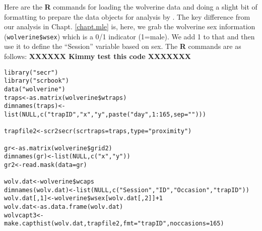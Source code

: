 Here are the {\bf R} commands for loading the wolverine data and doing
a slight bit of formatting to prepare the data objects for analysis by
\mbox{\secr}. The key difference from our analysis in
Chapt. \ref{chapt.mle} is, here, we grab the wolverine sex information
(\mbox{\tt wolverine\$wsex}) which is a 0/1 indicator (1=male). We add
1 to that and then use it to define the ``Session'' variable based on sex.
The {\bf R} commands are as follows:  {\bf XXXXXX Kimmy test this code XXXXXXX}
{\small
\begin{verbatim}
library("secr")
library("scrbook")
data("wolverine")
traps<-as.matrix(wolverine$wtraps)
dimnames(traps)<-list(NULL,c("trapID","x","y",paste("day",1:165,sep="")))

trapfile2<-scr2secr(scrtraps=traps,type="proximity")

gr<-as.matrix(wolverine$grid2)
dimnames(gr)<-list(NULL,c("x","y"))
gr2<-read.mask(data=gr)

wolv.dat<-wolverine$wcaps
dimnames(wolv.dat)<-list(NULL,c("Session","ID","Occasion","trapID"))
wolv.dat[,1]<-wolverine$wsex[wolv.dat[,2]]+1
wolv.dat<-as.data.frame(wolv.dat)
wolvcapt3<-make.capthist(wolv.dat,trapfile2,fmt="trapID",noccasions=165)
\end{verbatim}
}

